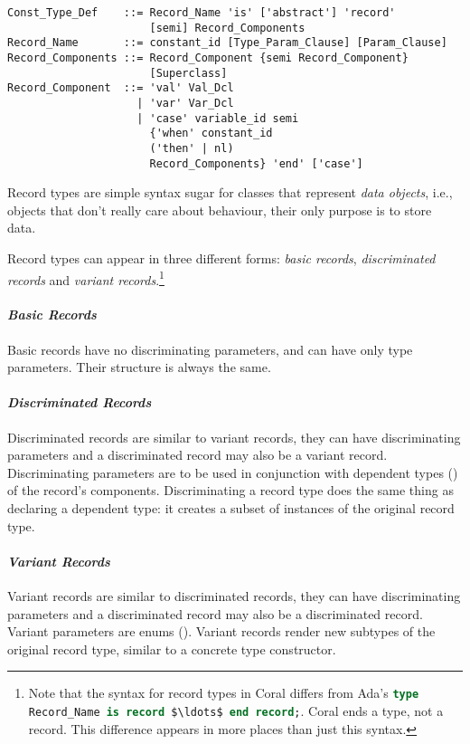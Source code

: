\syntax\begin{lstlisting}
Const_Type_Def    ::= Record_Name 'is' ['abstract'] 'record'
                      [semi] Record_Components
Record_Name       ::= constant_id [Type_Param_Clause] [Param_Clause]
Record_Components ::= Record_Component {semi Record_Component}
                      [Superclass]
Record_Component  ::= 'val' Val_Dcl
                    | 'var' Var_Dcl
                    | 'case' variable_id semi 
                      {'when' constant_id 
                      ('then' | nl) 
                      Record_Components} 'end' ['case']
\end{lstlisting}

Record types are simple syntax sugar for classes that represent {\em data objects}, i.e., objects that don't really care about behaviour, their only purpose is to store data. 

Record types can appear in three different forms: {\em basic records}, {\em discriminated records} and {\em variant records}.\footnote{Note that the syntax for record types in Coral differs from Ada's \lstinline[language=Ada]!type Record_Name is record $\ldots$ end record;!. Coral ends a type, not a record. This difference appears in more places than just this syntax.}

\paragraph{\em Basic Records}
Basic records have no discriminating parameters, and can have only type parameters. Their structure is always the same. 

\paragraph{\em Discriminated Records}
Discriminated records are similar to variant records, they can have discriminating parameters and a discriminated record may also be a variant record. Discriminating parameters are to be used in conjunction with dependent types () of the record's components. Discriminating a record type does the same thing as declaring a dependent type: it creates a subset of instances of the original record type. 

\paragraph{\em Variant Records}
Variant records are similar to discriminated records, they can have discriminating parameters and a discriminated record may also be a discriminated record. Variant parameters are enums (). Variant records render new subtypes of the original record type, similar to a concrete type constructor.

